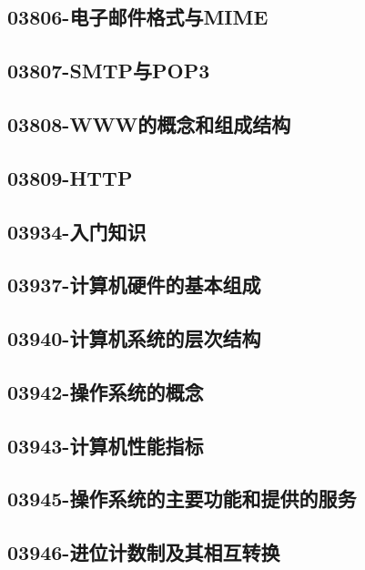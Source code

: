 \subsection{03806-电子邮件格式与MIME}

\subsection{03807-SMTP与POP3}

\subsection{03808-WWW的概念和组成结构}

\subsection{03809-HTTP}

\subsection{03934-入门知识}

\subsection{03937-计算机硬件的基本组成}

\subsection{03940-计算机系统的层次结构}

\subsection{03942-操作系统的概念}

\subsection{03943-计算机性能指标}

\subsection{03945-操作系统的主要功能和提供的服务}

\subsection{03946-进位计数制及其相互转换}

